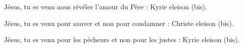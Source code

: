 Jésus, tu es venu nous révéler l'amour du Père :
Kyrie eleison (bis).

Jésus, tu es venu pour sauver et non pour condamner :
Christe eleison (bis).

Jésus, tu es venu pour les pécheurs et non pour les justes :
Kyrie eleison (bis).
